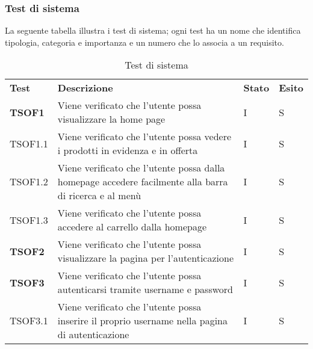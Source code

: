\subsubsection{Test di sistema}
La seguente tabella illustra i test di sistema; ogni test ha un nome che identifica tipologia, categoria e importanza e un numero che lo associa a un requisito.
\begin{center}
    \centering
    \renewcommand{\arraystretch}{1.8}
    \label{tab:TestSistema}
    \begin{longtable}[!h]{p{60px} p{240px} p{35px} p{35px}}
        \caption{Test di sistema}                                                                                                                                                \\
        \rowcolor{logo!70}
        \textbf{Test}   & \textbf{Descrizione}                                                                                                 & \textbf{Stato} & \textbf{Esito} \\
        \textbf{TSOF1}  & Viene verificato che l'utente possa visualizzare la home page                                                        & I              & S              \\
        TSOF1.1         & Viene verificato che l'utente possa vedere i prodotti in evidenza e in offerta                                       & I              & S              \\
        TSOF1.2         & Viene verificato che l'utente possa dalla homepage accedere facilmente alla barra di ricerca e al menù               & I              & S              \\
        TSOF1.3         & Viene verificato che l'utente possa accedere al carrello dalla homepage                                              & I              & S              \\
        \textbf{TSOF2}  & Viene verificato che l'utente possa visualizzare la pagina per l'autenticazione                                      & I              & S              \\
        \textbf{TSOF3}  & Viene verificato che l'utente possa autenticarsi tramite username e password                                         & I              & S              \\
        TSOF3.1         & Viene verificato che l'utente possa inserire il proprio username nella pagina di autenticazione                      & I              & S              \\

\end{longtable}
\end{center}
